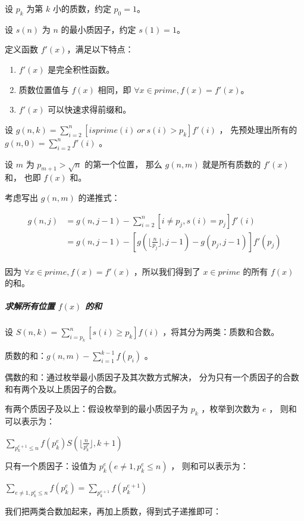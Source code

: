 \documentclass[a4paper,11pt]{article}
\begin{document}
设 \(p_k\) 为第 \(k\) 小的质数，约定 \(p_0=1\)。

设 \(s(n)\) 为 \(n\) 的最小质因子，约定 \(s(1)=1\)。

定义函数 \(f'(x)\)，满足以下特点：
\begin{enumerate}
  \item \(f'(x)\) 是完全积性函数。
  \item 质数位置值与 \(f(x)\) 相同，即 \(\forall x\in {prime}, f(x) = f'(x)\)。
  \item \(f'(x)\) 可以快速求得前缀和。
\end{enumerate}

设 \(g(n,k)=\sum\limits_{i=2}^{n}{[isprime(i)\ or\ s(i)>p_k]f'(i)}\) ，
先预处理出所有的 \(g(n,0)=\sum\limits_{i=2}^{n}{f'(i)}\) 。

设 \(m\) 为 \(p_{m+1}>\sqrt{n}\) 的第一个位置，
那么 \(g(n,m)\) 就是所有质数的 \(f'(x)\) 和，
也即 \(f(x)\) 和。 

考虑写出 \(g(n,m)\) 的递推式：

\[
\begin{aligned}
  g(n,j)&=g(n,j-1)-\sum\limits_{i=2}^{n}{[i\not = p_j,s(i)=p_j]f'(i)} \\
  &=g(n,j-1)-\left [g(\lfloor\frac{n}{p_j} \rfloor,j-1)-g(p_j,j-1)\right] f'(p_j) \\
\end{aligned}
\]

因为 \(\forall x\in {prime}, f(x) = f'(x)\) ，所以我们得到了 \(x\in {prime}\) 的所有 \(f(x)\) 的和。

\subparagraph{求解所有位置 \(f(x)\) 的和}
\leavevmode

设 \(S(n,k)=\sum\limits_{i=p_k}^{n}{[s(i)\ge p_k]f(i)}\) ，将其分为两类：质数和合数。

质数的和：\(g(n,m)-\sum\limits_{i=1}^{k-1}{f(p_i)}\) 。

偶数的和：通过枚举最小质因子及其次数方式解决，
分为只有一个质因子的合数和有两个及以上质因子的合数。

有两个质因子及以上：假设枚举到的最小质因子为 \(p_k\) ，枚举到次数为 \(e\) ，
则和可以表示为：

\(\sum\limits_{p_k^{e+1}\le n}{f(p_k^e)S(\lfloor\frac{n}{p_k^e} \rfloor,k+1)}\)

只有一个质因子：设值为 \(p_k^e(e\not = 1,p_k^e \le n)\) ，
则和可以表示为：

\(\sum\limits_{e\not = 1,p_k^e \le n}{f(p_k^e)}=\sum\limits_{p_k^{e+1}}{f(p_k^{e+1})}\)

我们把两类合数加起来，再加上质数，得到式子递推即可：
\end{document}
